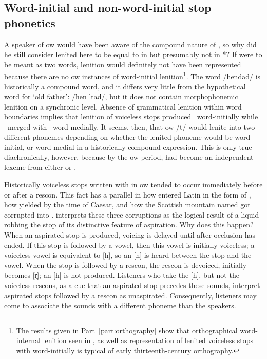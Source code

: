 \subsection{Word-initial and non-word-initial stop phonetics}
\label{sec:word-initial-non}
A speaker of \gls{ow} would have been aware of the compound nature of , so why did he still consider lenited  here to be equal to  in  but presumably not in *? If  were to be meant  as two words, lenition would definitely not have been represented because there are no \gls{ow} instances of word-initial lenition\footnote{The results given in Part~\ref{part:orthography} show that orthographical word-internal lenition seen in , as well as representation of lenited voiceless stops with  word-initially is typical of early thirteenth-century orthography.}.  The word  /hendad/ is historically  a compound word, and it differs very little from the hypothetical word for `old father':  /hen \gls{l}tad/, but it does not contain morphophonemic lenition on a synchronic level. Absence of grammatical lenition within word boundaries implies that lenition of voiceless stops produced \lT\ word-initially while \lT\  merged with \xD\ word-medially. It seems, then, that \gls{ow} /t/ would lenite into two different phonemes depending on whether the lenited phoneme would be word-initial, or word-medial in a historically compound expression. This is only true diachronically, however, because by the \gls{ow} period,  had become an independent lexeme from either  or . 

Historically voiceless stops written with  in \gls{ow} tended to occur immediately before or after a \gls{rescon}. This fact has a parallel in how  entered Latin in the form of , how  yielded  by the time of Caesar, and how the Scottish mountain named  got corrupted into . \textcite[§~25]{koch_*cothairche_1990} interprets these three corruptions as the logical result of a liquid robbing the stop of its distinctive feature of aspiration. Why does this happen? When an aspirated stop is produced, voicing is delayed until after occlusion has ended. If this stop is followed by a vowel, then this vowel is initially voiceless; a voiceless vowel is equivalent to [h], so an [h] is heard between the stop and the vowel. When the stop is followed by a \gls{rescon}, the \gls{rescon} is devoiced, \eg [r] initially becomes [r̥]; an [h] is not produced. Listeners who take the [h], but not the voiceless \gls{rescon}s, as a cue that an aspirated stop precedes these sounds, interpret aspirated stops followed by a \gls{rescon} as unaspirated. Consequently, listeners may come to associate the sounds with a different \gls{phoneme} than the speakers.

